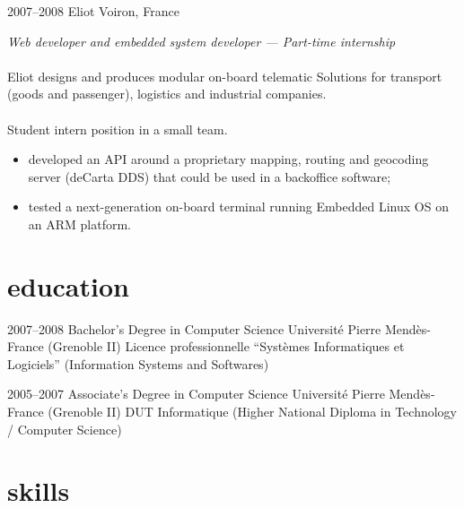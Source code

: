 \documentclass[]{friggeri-cv}
\begin{document}
\begin{entrylist}
  \entry
    {2007--2008}
    {Eliot}
    {Voiron, France}
    {
        \textit{Web developer and embedded system developer --- Part-time
        internship} \\
        \\
        Eliot designs and produces modular on-board telematic Solutions for
        transport (goods and passenger), logistics and industrial companies. \\
        \\
        Student intern position in a small team.
        \begin{itemize}
          \item developed an API around a proprietary mapping, routing and
                geocoding server (deCarta DDS) that could be used in a
                backoffice software;
          \item tested a next-generation on-board terminal running Embedded
                Linux OS on an ARM platform.
        \end{itemize}
    }

\end{entrylist}



\section{education}

\begin{entrylist}

\entry
  {2007--2008}
  {Bachelor's Degree {\normalfont in Computer Science}}
  {Université Pierre Mendès-France (Grenoble II)}
  {
    Licence professionnelle ``Systèmes Informatiques et Logiciels''
    (Information Systems and Softwares)
  }

\entry
  {2005--2007}
  {Associate's Degree {\normalfont in Computer Science}}
  {Université Pierre Mendès-France (Grenoble II)}
  {
    DUT Informatique (Higher National Diploma in Technology / Computer
    Science)
  }

\end{entrylist}



\newpage

\section{skills}
\end{document}
